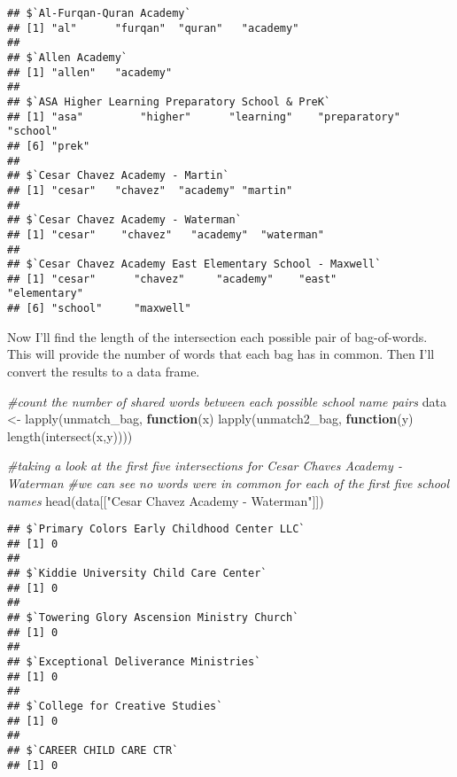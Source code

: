 \documentclass[
]{article}
\newenvironment{Shaded}{\begin{snugshade}}{\end{snugshade}}
\newcommand{\CommentTok}[1]{\textcolor[rgb]{0.56,0.35,0.01}{\textit{#1}}}
\newcommand{\ControlFlowTok}[1]{\textcolor[rgb]{0.13,0.29,0.53}{\textbf{#1}}}
\newcommand{\FunctionTok}[1]{\textcolor[rgb]{0.00,0.00,0.00}{#1}}
\newcommand{\NormalTok}[1]{#1}
\newcommand{\OtherTok}[1]{\textcolor[rgb]{0.56,0.35,0.01}{#1}}
\newcommand{\SpecialCharTok}[1]{\textcolor[rgb]{0.00,0.00,0.00}{#1}}
\newcommand{\StringTok}[1]{\textcolor[rgb]{0.31,0.60,0.02}{#1}}
\begin{document}
\begin{verbatim}
## $`Al-Furqan-Quran Academy`
## [1] "al"      "furqan"  "quran"   "academy"
## 
## $`Allen Academy`
## [1] "allen"   "academy"
## 
## $`ASA Higher Learning Preparatory School & PreK`
## [1] "asa"         "higher"      "learning"    "preparatory" "school"     
## [6] "prek"       
## 
## $`Cesar Chavez Academy - Martin`
## [1] "cesar"   "chavez"  "academy" "martin" 
## 
## $`Cesar Chavez Academy - Waterman`
## [1] "cesar"    "chavez"   "academy"  "waterman"
## 
## $`Cesar Chavez Academy East Elementary School - Maxwell`
## [1] "cesar"      "chavez"     "academy"    "east"       "elementary"
## [6] "school"     "maxwell"
\end{verbatim}

Now I'll find the length of the intersection each possible pair of
bag-of-words. This will provide the number of words that each bag has in
common. Then I'll convert the results to a data frame.

\begin{Shaded}
\begin{Highlighting}[]
\CommentTok{\#count the number of shared words between each possible school name pairs }
\NormalTok{data }\OtherTok{\textless{}{-}} \FunctionTok{lapply}\NormalTok{(unmatch\_bag, }\ControlFlowTok{function}\NormalTok{(x) }\FunctionTok{lapply}\NormalTok{(unmatch2\_bag, }\ControlFlowTok{function}\NormalTok{(y) }\FunctionTok{length}\NormalTok{(}\FunctionTok{intersect}\NormalTok{(x,y))))}

\CommentTok{\#taking a look at the first five intersections for Cesar Chaves Academy {-} Waterman}
\CommentTok{\#we can see no words were in common for each of the first five school names}
\FunctionTok{head}\NormalTok{(data[[}\StringTok{"Cesar Chavez Academy {-} Waterman"}\NormalTok{]]) }
\end{Highlighting}
\end{Shaded}

\begin{verbatim}
## $`Primary Colors Early Childhood Center LLC`
## [1] 0
## 
## $`Kiddie University Child Care Center`
## [1] 0
## 
## $`Towering Glory Ascension Ministry Church`
## [1] 0
## 
## $`Exceptional Deliverance Ministries`
## [1] 0
## 
## $`College for Creative Studies`
## [1] 0
## 
## $`CAREER CHILD CARE CTR`
## [1] 0
\end{verbatim}

\begin{Shaded}
\end{Shaded}
\end{document}
